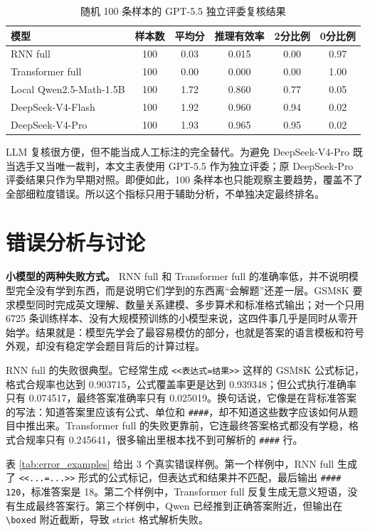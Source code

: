 \documentclass[UTF8,a4paper,zihao=-4]{ctexart}
\begin{document}
\begin{table}[H]
\centering
\caption{随机 100 条样本的 GPT-5.5 独立评委复核结果}
\label{tab:judge}
\small
\begin{tabular}{lccccc}
\toprule
模型 & 样本数 & 平均分 & 推理有效率 & 2分比例 & 0分比例 \\
\midrule
RNN full & 100 & 0.03 & 0.015 & 0.00 & 0.97 \\
Transformer full & 100 & 0.00 & 0.000 & 0.00 & 1.00 \\
Local Qwen2.5-Math-1.5B & 100 & 1.72 & 0.860 & 0.77 & 0.05 \\
DeepSeek-V4-Flash & 100 & 1.92 & 0.960 & 0.94 & 0.02 \\
DeepSeek-V4-Pro & 100 & 1.93 & 0.965 & 0.95 & 0.02 \\
\bottomrule
\end{tabular}
\end{table}

LLM 复核很方便，但不能当成人工标注的完全替代。为避免 DeepSeek-V4-Pro 既当选手又当唯一裁判，本文主表使用 GPT-5.5 作为独立评委；原 DeepSeek-Pro 评委结果只作为早期对照。即便如此，100 条样本也只能观察主要趋势，覆盖不了全部细粒度错误。所以这个指标只用于辅助分析，不单独决定最终排名。

\section{错误分析与讨论}

\textbf{小模型的两种失败方式。}
RNN full 和 Transformer full 的准确率低，并不说明模型完全没有学到东西，而是说明它们学到的东西离“会解题”还差一层。GSM8K 要求模型同时完成英文理解、数量关系建模、多步算术和标准格式输出；对一个只用 6725 条训练样本、没有大规模预训练的小模型来说，这四件事几乎是同时从零开始学。结果就是：模型先学会了最容易模仿的部分，也就是答案的语言模板和符号外观，却没有稳定学会题目背后的计算过程。

RNN full 的失败很典型。它经常生成 \texttt{<<表达式=结果>>} 这样的 GSM8K 公式标记，格式合规率也达到 0.903715，公式覆盖率更是达到 0.939348；但公式执行准确率只有 0.074517，最终答案准确率只有 0.025019。换句话说，它像是在背标准答案的写法：知道答案里应该有公式、单位和 \texttt{\#\#\#\#}，却不知道这些数字应该如何从题目中推出来。Transformer full 的失败更靠前，它连最终答案格式都没有学稳，格式合规率只有 0.245641，很多输出里根本找不到可解析的 \texttt{\#\#\#\#} 行。

表 \ref{tab:error_examples} 给出 3 个真实错误样例。第一个样例中，RNN full 生成了 \texttt{<<...=...>>} 形式的公式标记，但表达式和结果并不匹配，最后输出 \texttt{\#\#\#\# 120}，标准答案是 18。第二个样例中，Transformer full 反复生成无意义短语，没有生成最终答案行。第三个样例中，Qwen 已经推到正确答案附近，但输出在 \texttt{\textbackslash boxed} 附近截断，导致 strict 格式解析失败。
\end{document}
